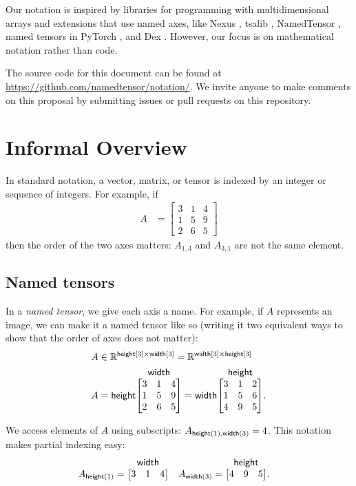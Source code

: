 \documentclass{article}
\makeatletter
\newcommand{\nmatrix}[3]{\name{#1}\begin{array}[b]{@{}c@{}}\name{#2}\\\begin{bmatrix}#3\end{bmatrix}\end{array}}
\newcommand{\reals}{\mathbb{R}}
\makeatother
\begin{document}
Our notation is inspired by libraries for programming with multidimensional arrays \citep{numpy,pytorch} and extensions that use named axes, like Nexus \citep{chen2017typesafe}, tsalib \citep{tsalib}, NamedTensor \citep{namedtensor}, named tensors in PyTorch \citep{named-tensors}, and Dex \citep{maclaurin+:2019}. However, our focus is on mathematical notation rather than code.

The source code for this document can be found at \url{https://github.com/namedtensor/notation/}. We invite anyone to make comments on this proposal by submitting issues or pull requests on this repository.

\section{Informal Overview}
\label{sec:overview}

In standard notation, a vector, matrix, or tensor is indexed by an integer or sequence of integers. For example, if
\begin{align*}
  A &= \begin{bmatrix}
    3 & 1 & 4 \\
    1 & 5 & 9 \\
    2 & 6 & 5
  \end{bmatrix}
\end{align*}
then the order of the two axes matters: $A_{1,3}$ and $A_{3,1}$ are not the same element.

\subsection{Named tensors}

In a \emph{named tensor}, we give each axis a name. For example, if $A$ represents an image, we can make it a named tensor like so (writing it two equivalent ways to show that the order of axes does not matter):
\begin{align*}
  A &\in \reals^{\nset{height}{3} \times \nset{width}{3}} = \reals^{\nset{width}{3} \times \nset{height}{3}} \\
  A &= \nmatrix{height}{width}{
    3 & 1 & 4 \\
    1 & 5 & 9 \\
    2 & 6 & 5
  } = \nmatrix{width}{height}{
    3 & 1 & 2 \\
    1 & 5 & 6 \\
    4 & 9 & 5
  }.
\end{align*}

We access elements of $A$ using subscripts: $A_{\mathsf{height}(1), \mathsf{width}(3)} = 4$.
This notation makes partial indexing easy:
\begin{align*}
A_{\nidx{height}{1}} &= \nmatrix{}{width}{
  3 & 1 & 4
}
&
A_{\nidx{width}{3}} &= \nmatrix{}{height}{
  4 & 9 & 5
}.
\end{align*}
\end{document}
